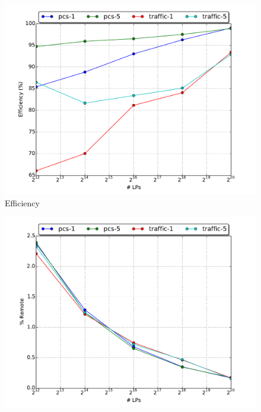 \documentclass[11pt]{book}
\begin{document}
\begin{figure}
  \begin{minipage}{.5\textwidth}
    \begin{center}
      \includegraphics[width=\textwidth,keepaspectratio,quiet]{figs/scale/scale_efficiency.pdf} \\
      Efficiency \\
    \end{center}
  \end{minipage}%
  \hfill
  \begin{minipage}{.5\textwidth}
    \begin{center}
      \includegraphics[width=\textwidth,keepaspectratio,quiet]{figs/scale/scale_premote.pdf} \\

\end{center}
\end{minipage}
\end{figure}
\end{document}
